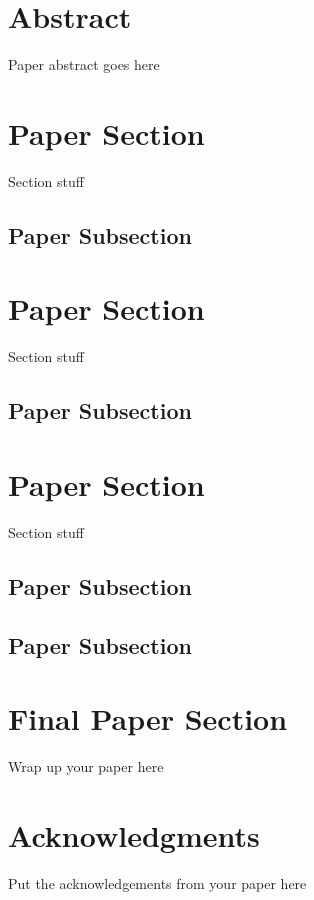 
\section*{Abstract}
Paper abstract goes here
\section{Paper Section}
Section stuff

\subsection{Paper Subsection}
\section{Paper Section}
Section stuff

\subsection{Paper Subsection}
\section{Paper Section}
Section stuff

\subsection{Paper Subsection}

\subsection{Paper Subsection}
\section{Final Paper Section}
Wrap up your paper here

\section*{Acknowledgments}
Put the acknowledgements from your paper here

